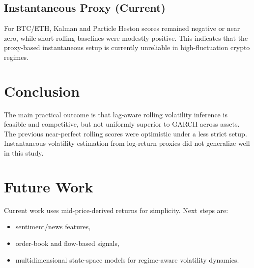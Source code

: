\documentclass[10pt]{article}
\begin{document}
\subsection{Instantaneous Proxy (Current)}
For BTC/ETH, Kalman and Particle Heston scores remained negative or near zero, while short rolling baselines were modestly positive. This indicates that the proxy-based instantaneous setup is currently unreliable in high-fluctuation crypto regimes.

\section{Conclusion}
The main practical outcome is that lag-aware rolling volatility inference is feasible and competitive, but not uniformly superior to GARCH across assets. The previous near-perfect rolling scores were optimistic under a less strict setup. Instantaneous volatility estimation from log-return proxies did not generalize well in this study.

\section{Future Work}
Current work uses mid-price-derived returns for simplicity. Next steps are:
\begin{itemize}[leftmargin=1.2em]
  \item sentiment/news features,
  \item order-book and flow-based signals,
  \item multidimensional state-space models for regime-aware volatility dynamics.
\end{itemize}
\end{document}
